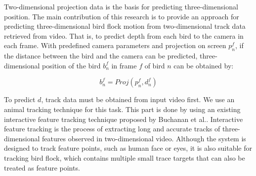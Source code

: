 Two-dimensional projection data is the basis for predicting three-dimensional position. The main contribution of this research is to provide an approach for predicting three-dimensional bird flock motion from two-dimensional track data retrieved from video. That is, to predict depth from each bird to the camera in each frame. With predefined camera parameters and projection on screen $p_n^f$, if the distance between the bird and the camera can be predicted, three-dimensional position of the bird $b_n^f$ in frame $f$ of bird $n$ can be obtained by:


\begin{equation}\label{eq:projection}
 b_n^f=Proj(p_n^f,d_n^f)
\end{equation}


To predict $d$, track data must be obtained from input video first. We use an animal tracking technique for this task. This part is done by using an existing interactive feature tracking technique proposed by Buchanan et al.\cite{Tracking}. Interactive feature tracking is the process of extracting long and accurate tracks of three-dimensional features observed in two-dimensional video. Although the system is designed to track feature points, such as human face or eyes, it is also suitable for tracking bird flock, which contains multiple small trace targets that can also be treated as feature points.



